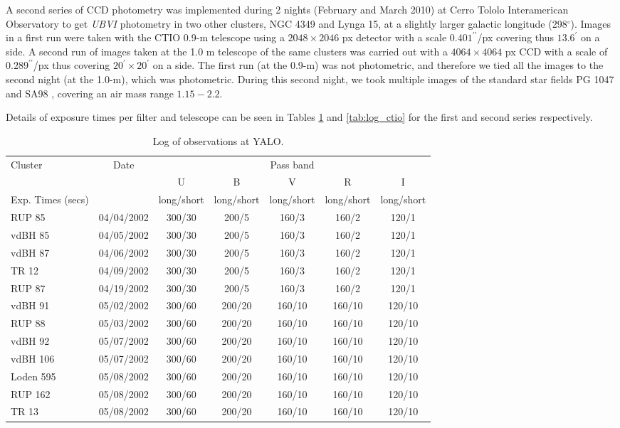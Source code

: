 \documentclass[draft]{aa}
\begin{document}
A second series of CCD photometry was implemented during 2 nights (February and
March 2010) at Cerro Tololo Interamerican Observatory to get \textit{UBVI}
photometry in two other clusters, NGC 4349 and Lynga 15, at a slightly larger
galactic longitude (298$^\circ$). Images in a first run were taken with the CTIO
0.9-m telescope using a $2048\times2046$ px detector with a scale
$0.401^{\prime\prime}$/px covering thus $13.6^{\prime}$ on a side. A second run
of images taken at the 1.0 m telescope of the same clusters was carried out
with a $4064\times4064$ px CCD with a scale of $0.289^{\prime\prime}$/px thus
covering $20^\prime\times20^\prime$ on a side.
%
The first run (at the 0.9-m) was not photometric, and therefore we tied all
the images to the second night (at the 1.0-m), which was photometric. During
this second night, we took multiple images of the standard star fields PG 1047
and SA98 \citep{1992AJ....104..340L}, covering an air mass range $1.15-2.2$.

Details of exposure times per filter and telescope can be seen in Tables
\ref{tab:log_yalo} and \ref{tab:log_ctio} for the first and second series
respectively.\\


\begin{table}[ht]
    \centering
    \begin{tabular}{lcccccc}
    \hline 
        Cluster & Date &  &  & Pass band &  & \\
        &  & U & B & V & R & I\\
        Exp. Times (secs) &  & long/short & long/short & long/short &
        long/short & long/short\\
       \hline \hline 
        RUP 85 & 04/04/2002 & 300/30 & 200/5 & 160/3 & 160/2 & 120/1\\
        vdBH 85 & 04/05/2002 & 300/30 & 200/5 & 160/3 & 160/2 & 120/1\\
        vdBH 87 & 04/06/2002 & 300/30 & 200/5 & 160/3 & 160/2 & 120/1\\
        TR 12 & 04/09/2002 & 300/30 & 200/5 & 160/3 & 160/2 & 120/1\\
        RUP 87 & 04/19/2002 & 300/30 & 200/5 & 160/3 & 160/2 & 120/1\\
        vdBH 91 & 05/02/2002 & 300/60 & 200/20 & 160/10 & 160/10 & 120/10\\
        RUP 88 & 05/03/2002 & 300/60 & 200/20 & 160/10 & 160/10 & 120/10\\
        vdBH 92 & 05/07/2002 & 300/60 & 200/20 & 160/10 & 160/10 & 120/10\\
        vdBH 106 & 05/07/2002 & 300/60 & 200/20 & 160/10 & 160/10 & 120/10\\
        Loden 595 & 05/08/2002 & 300/60 & 200/20 & 160/10 & 160/10 & 120/10\\
        RUP 162 & 05/08/2002 & 300/60 & 200/20 & 160/10 & 160/10 & 120/10\\
        TR 13 & 05/08/2002 & 300/60 & 200/20 & 160/10 & 160/10 & 120/10\\
        \hline
    \end{tabular}
    \caption{Log of observations at YALO.}
    \label{tab:log_yalo}
\end{table}
\end{document}
